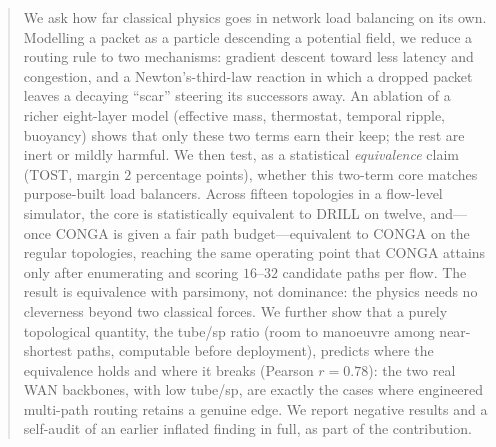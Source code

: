 \begin{abstract}
We ask how far classical physics goes in network load balancing on its own.
Modelling a packet as a particle descending a potential field, we reduce a
routing rule to two mechanisms: gradient descent toward less latency and
congestion, and a Newton's-third-law reaction in which a dropped packet leaves
a decaying ``scar'' steering its successors away. An ablation of a richer
eight-layer model (effective mass, thermostat, temporal ripple, buoyancy)
shows that only these two terms earn their keep; the rest are inert or mildly
harmful. We then test, as a statistical \emph{equivalence} claim (TOST,
margin $2$ percentage points), whether this two-term core matches purpose-built
load balancers. Across fifteen topologies in a flow-level simulator, the core
is statistically equivalent to DRILL on twelve, and---once CONGA is given a
fair path budget---equivalent to CONGA on the regular topologies, reaching the
same operating point that CONGA attains only after enumerating and scoring
$16$--$32$ candidate paths per flow. The result is equivalence with parsimony,
not dominance: the physics needs no cleverness beyond two classical forces. We
further show that a purely topological quantity, the tube/sp ratio (room to
manoeuvre among near-shortest paths, computable before deployment), predicts
where the equivalence holds and where it breaks (Pearson $r = 0.78$): the two
real WAN backbones, with low tube/sp, are exactly the cases where engineered
multi-path routing retains a genuine edge. We report negative results and a
self-audit of an earlier inflated finding in full, as part of the contribution.
\end{abstract}
